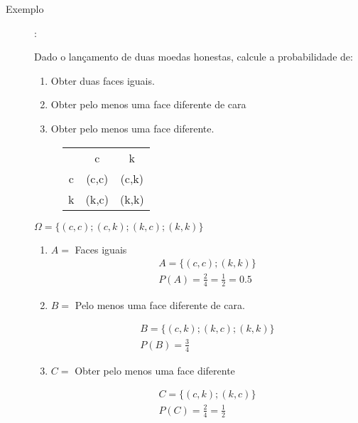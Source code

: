 \documentclass[11pt,a4paper]{book}
\begin{document}
\begin{description}
  \item [Exemplo]: 

    Dado o lançamento de duas moedas honestas, calcule a probabilidade de: 
    \begin{enumerate}[label=(\alph*)]
      \item  Obter duas faces iguais.
      \item Obter pelo menos uma face diferente de cara
      \item  Obter pelo menos uma face diferente.
    \end{enumerate}
    \begin{figure} [H]
      \centering
      \begin{tabular}{c c c}
        \toprule
        &c&k\\ \cmidrule{2-3}
        c&(c,c)&(c,k)\\ \cmidrule{2-3}
        k&(k,c)&(k,k)\\    \bottomrule
      \end{tabular}
      \label{tab:1}
    \end{figure}

    $\Omega = \{ (c,c); (c,k) ; (k,c) ; (k,k)\}$
    \begin{enumerate}[label=(\alph*)]
      \item $A=$ Faces iguais
        \begin{align*}
          A= \{ (c,c) ; (k,k) \} \\
          P(A) = \frac{2}{4} = \frac{1}{2}= 0.5
        \end{align*}
      \item $B=$ Pelo menos uma face diferente de cara.

        \begin{align*}
          B= \{ (c,k) ; (k,c) ; (k,k) \} \\
          P(B)= \frac{3}{4}
        \end{align*}

      \item $C=$ Obter pelo menos uma face diferente

        \begin{align*}
          C= \{ (c,k) ; (k,c) \} \\
          P(C)= \frac{2}{4}= \frac{1}{2}
        \end{align*}
    \end{enumerate}

\end{description}
\end{document}
